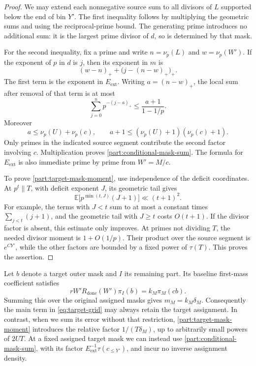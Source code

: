 \begin{proof}
We may extend each nonnegative source sum to all divisors of $L$
supported below the end of bin $Y'$.  The first inequality follows by
multiplying the geometric sums and using the reciprocal-prime bound.
The generating prime introduces no additional sum: it is the largest
prime divisor of $d$, so is determined by that mask.

For the second inequality, fix a prime and write
$n=\nu_p(L)$ and $w=\nu_p(W')$.  If the exponent of $p$ in $d$ is
$j$, then its exponent in $m$ is
\[
 (w-n)_++\bigl(j-(n-w)_+\bigr)_+.
\]
The first term is the exponent in $E_{\mathrm{ext}}$.  Writing
$a=(n-w)_+$, the local sum after removal of that term is at most
\[
 \sum_{j=0}^n p^{-(j-a)_+}
 \le \frac{a+1}{1-1/p}.
\]
Moreover
\[
 a\le \nu_p(U)+\nu_p(c),
 \qquad
 a+1\le (\nu_p(U)+1)(\nu_p(c)+1).
\]
Only primes in the indicated source segment contribute the second
factor involving $c$.  Multiplication proves
\eqref{part:conditional-mask-sum}.  The formula for
$E_{\mathrm{ext}}$ is also immediate prime by prime from $W'=M/c$.

To prove \eqref{part:target-mask-moment}, use independence of the
deficit coordinates.  At $p^t\parallel T$, with deficit exponent
$J$, its geometric tail gives
\[
 \mathbb E\bigl[p^{\min(t,J)}(J+1)\bigr]
 \ll (t+1)^2.
\]
For example, the terms with $J<t$ sum to at most a constant times
$\sum_{j<t}(j+1)$, and the geometric tail with $J\ge t$ costs
$O(t+1)$.  If the divisor factor is absent, this estimate only
improves.  At primes not dividing $T$, the needed divisor moment is
$1+O(1/p)$.  Their product over the source segment is $e^{CY'}$,
while the other factors are bounded by a fixed power of $\tau(T)$.
This proves the assertion.
\end{proof}

Let $b$ denote a target outer mask and $I$ its remaining part.  Its
baseline first-mass coefficient satisfies
\begin{equation}
 rW'R_{\mathrm{done}}(W')\pi_I(b)
       =k_M\pi_M(cb).
\label{part:target-currency}
\end{equation}
Summing this over the original assigned masks gives $m_M=k_M\delta_M$.
Consequently the main term in \eqref{eq:target-grid} may always retain
the target assignment.  In contrast, when we sum its error without
that restriction, \eqref{part:target-mask-moment} introduces the
relative factor $1/(T\delta_M)$, up to arbitrarily small powers of
$2UT$.  At a fixed assigned target mask we can instead use
\eqref{part:conditional-mask-sum}, with its factor
$E_{\mathrm{ext}}^{-1}\tau(c_{\le Y'})$, and incur no inverse
assignment density.

